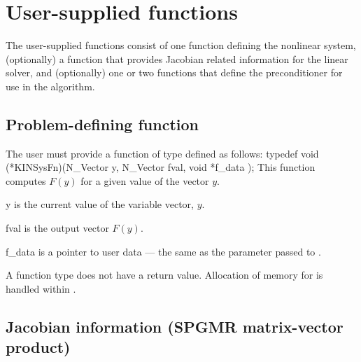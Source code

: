\section{User-supplied functions}\label{ss:user_fct_sol}

The user-supplied functions consist of one function defining the nonlinear system, 
(optionally) a function that provides Jacobian related information for the linear
solver, and (optionally) one or two functions that define the preconditioner for 
use in the {\spgmr} algorithm. 

\subsection{Problem-defining function} \label{ss:sysFn}

The user must provide a function of type  defined as follows:
{
  typedef void (*KINSysFn)(N\_Vector y, N\_Vector fval, void *f\_data );
}
{
  This function computes $F(y)$ for a given value of the vector $y$.
}
{
  \begin{args}[f\_data]
  \item[y]
    is the current value of the variable vector, $y$.
  \item[fval]
    is the output vector $F(y)$.
  \item[f\_data]
    is a pointer to user data --- the same as the       
    parameter passed to .   
  \end{args}
}
{
  A  function type does not have a return value.
}
{
Allocation of memory for  is handled within {\kinsol}.
}



\subsection{Jacobian information (SPGMR matrix-vector product)}
\label{ss:jtimesFn}

